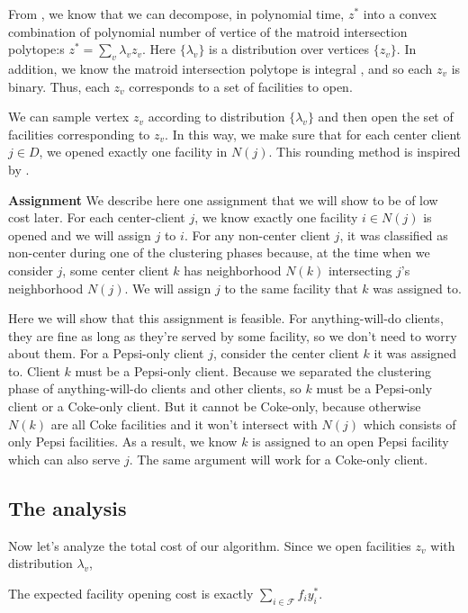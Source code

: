 From \cite{grotschel1981ellipsoid}, we know that we can decompose,
in polynomial time, $z^*$ into a convex combination of polynomial number of vertice of
the matroid intersection polytope:s
$z^* = \sum_{v} \lambda_v z_v$.
Here $\{\lambda_v\}$ is a distribution over vertices $\{z_v\}$.
In addition, we know the matroid intersection polytope is integral \cite{schrijver2003combinatorial}, and
so each $z_v$ is binary. Thus, each $z_v$ corresponds to a set of facilities to open.

We can sample vertex $z_v$ according to distribution $\{\lambda_v\}$
and then open the set of facilities corresponding to $z_v$.
In this way, we make sure that for each center client $j \in D$, we opened exactly one facility in $N(j)$.
This rounding method is inspired by \cite{swamy2013improved}.

\textbf{Assignment} We describe here one assignment that we will show to be of low cost later.
For each center-client $j$, we know exactly one facility $i \in N(j)$
is opened and we will assign $j$ to $i$.
For any non-center client $j$, it was classified as non-center during one of the clustering phases
because, at the time when we consider $j$, some center client $k$ has neighborhood $N(k)$
intersecting $j$'s neighborhood $N(j)$. We will assign $j$ to the same facility that $k$ was assigned to.

Here we will show that this assignment is feasible.
For anything-will-do clients, they are fine as long as they're served by some facility, so we don't need to worry about them.
For a Pepsi-only client $j$, consider the center client $k$ it was assigned to.
Client $k$ must be a Pepsi-only client. Because we separated the clustering phase of anything-will-do clients
and other clients, so $k$ must be a Pepsi-only client or a Coke-only client.
But it cannot be Coke-only, because otherwise $N(k)$ are all Coke facilities and it won't intersect with
$N(j)$ which consists of only Pepsi facilities.
As a result, we know $k$ is assigned to an open Pepsi facility which can also serve $j$.
The same argument will work for a Coke-only client.


\subsection{The analysis}

Now let's analyze the total cost of our algorithm. Since we open facilities $z_v$ with distribution $\lambda_v$, 

\begin{lem}
The expected facility opening cost is exactly %
$\sum_{i \in \mathcal{F}} f_i y^*_i$.
\end{lem}


